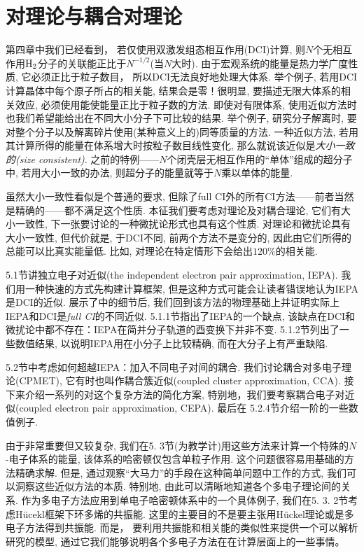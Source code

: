 \chapter{对理论与耦合对理论}
第四章中我们已经看到，
若仅使用双激发组态相互作用(DCI)计算, 
则$N$个无相互作用$\mathrm{H}_2$分子的关联能正比于$N^{-1/2}$(当$N$大时). 
由于宏观系统的能量是热力学广度性质, 
它必须正比于粒子数目，
所以DCI无法良好地处理大体系. 
举个例子, 
若用DCI计算晶体中每个原子所占的相关能, 
结果会是零！很明显, 
要描述无限大体系的相关效应, 
必须使用能使能量正比于粒子数的方法. 
即使对有限体系, 
使用近似方法时也我们希望能给出在不同大小分子下可比较的结果. 
举个例子, 
研究分子解离时, 
要对整个分子以及解离碎片使用(某种意义上的)同等质量的方法. 
一种近似方法, 
若用其计算所得的能量在体系增大时按粒子数目线性变化, 
那么就说该近似是\emph{大小一致的(size consistent)}. 
之前的特例——$N$个闭壳层无相互作用的``单体''组成的超分子中, 
若用大小一致的办法, 
则超分子的能量就等于$N$乘以单体的能量.


虽然大小一致性看似是个普通的要求, 
但除了full CI外的所有CI方法——前者当然是精确的——都不满足这个性质. 
本征我们要考虑对理论及对耦合理论, 
它们有大小一致性, 
下一张要讨论的一种微扰论形式也具有这个性质. 
对理论和微扰论具有大小一致性, 
但代价就是, 
于DCI不同, 
前两个方法不是变分的, 
因此由它们所得的总能可以比真实能量低. 
比如, 
对理论在特定情形下会给出$120\%$的相关能.


5.1节讲独立电子对近似(the independent electron pair approximation, IEPA). 我们用一种快速的方式先构建计算框架, 但是这种方式可能会让读者错误地认为IEPA是DCI的近似. 展示了中的细节后, 我们回到该方法的物理基础上并证明实际上IEPA和DCI是\emph{full CI}的不同近似. 5.1.1节指出了IEPA的一个缺点, 该缺点在DCI和微扰论中都不存在：IEPA在简并分子轨道的酉变换下并非不变. 5.1.2节列出了一些数值结果, 以说明IEPA用在小分子上比较精确, 而在大分子上有严重缺陷.

5.2节中考虑如何超越IEPA：加入不同电子对间的耦合. 我们讨论耦合对多电子理论(CPMET), 它有时也叫作耦合簇近似(coupled cluster approximation, CCA). 接下来介绍一系列的对这个复杂方法的简化方案, 特别地，我们要考察耦合电子对近似(coupled electron pair approximation, CEPA). 最后在 5.2.4节介绍一阶的一些数值例子.

由于非常重要但又较复杂, 
我们在5.
3节(为教学计)用这些方法来计算一个特殊的$N$-电子体系的能量, 
该体系的哈密顿仅包含单粒子作用. 
这个问题很容易用基础的方法精确求解. 
但是, 
通过观察``大马力''的手段在这种简单问题中工作的方式, 
我们可以洞察这些近似方法的本质. 
特别地, 
由此可以清晰地知道各个多电子理论间的关系. 
作为多电子方法应用到单电子哈密顿体系中的一个具体例子, 
我们在5.
3.
2节考虑H\"ucekl框架下环多烯的共振能. 
这里的主要目的不是要主张用H\"uckel理论或是多电子方法得到共振能. 
而是，
要利用共振能和相关能的类似性来提供一个可以解析研究的模型, 
通过它我们能够说明各个多电子方法在在计算层面上的一些事情。


